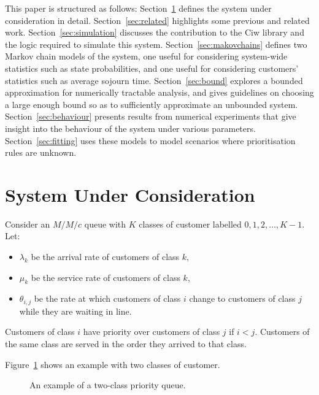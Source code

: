 \documentclass{article}
\begin{document}
This paper is structured as follows:
Section~\ref{sec:system} defines the system under consideration in detail.
Section~\ref{sec:related} highlights some previous and related work.
Section~\ref{sec:simulation} discusses the contribution to the Ciw library and
the logic required to simulate this system.
Section~\ref{sec:makovchains} defines two Markov chain models of the system, one
useful for considering system-wide statistics such as state probabilities, and
one useful for considering customers' statistics such as average sojourn time.
Section~\ref{sec:bound} explores a bounded approximation for numerically
tractable analysis, and gives guidelines on choosing a large enough bound so as
to sufficiently approximate an unbounded system.
Section~\ref{sec:behaviour} presents results from numerical experiments that
give insight into the behaviour of the system under various parameters.
Section~\ref{sec:fitting} uses these models to model scenarios where
prioritisation rules are unknown.





\section{System Under Consideration}\label{sec:system}
Consider an $M/M/c$ queue with $K$ classes of customer labelled
$0, 1, 2, \dots, K-1$.
Let:

\begin{itemize}
  \item $\lambda_k$ be the arrival rate of customers of class $k$,
  \item $\mu_k$ be the service rate of customers of class $k$,
  \item $\theta_{i,j}$ be the rate at which customers of class $i$ change
  to customers of class $j$ while they are waiting in line.
\end{itemize}

Customers of class $i$ have priority over customers of class $j$ if $i < j$.
Customers of the same class are served in the order they arrived to that class.

Figure~\ref{fig:twoclass_example} shows an example with two classes of customer.

\begin{figure}
\begin{center}

\end{center}
\caption{An example of a two-class priority queue.}
\label{fig:twoclass_example}
\end{figure}
\end{document}
